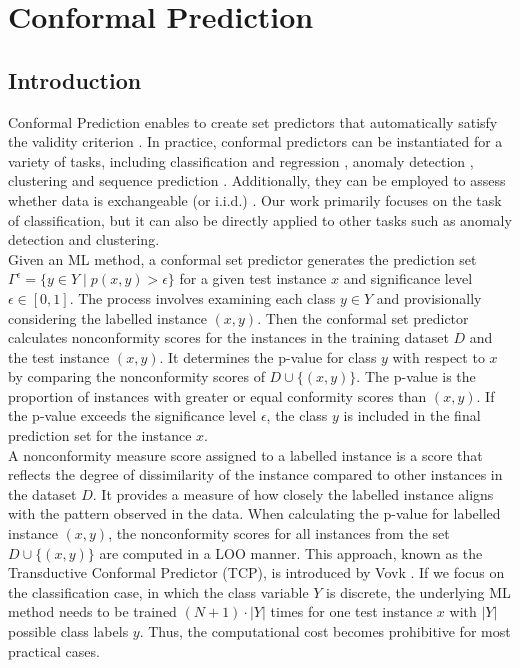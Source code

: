 \documentclass[10pt]{reportMaster}
\begin{document}
\section{Conformal Prediction}

\subsection{Introduction}

Conformal Prediction enables to create set predictors that automatically satisfy the validity criterion \cite{vovk2005algorithmic}. In practice, conformal predictors can be instantiated for a variety of tasks, including classification and regression \cite{vovk2005algorithmic, papadopoulos2002inductive, nouretdinov2001ridge}, anomaly detection \cite{laxhammar2010conformal}, clustering \cite{cherubin2015conformal, jung2021clustering} and sequence prediction \cite{cherubin2016hidden}. Additionally, they can be employed to assess whether data is exchangeable (or i.i.d.) \cite{vovk2003testing}. Our work primarily focuses on the task of classification, but it can also be directly applied to other tasks such as anomaly detection and clustering.\\

\noindent  Given an ML method, a conformal set predictor generates the prediction set $\Gamma^{\epsilon} = \{y \in Y \;|\; p(x,y)>\epsilon\}$ for a given test instance $x$ and significance level $\epsilon \in [0, 1]$. The process involves examining each class $y \in Y$ and provisionally considering the labelled instance $(x, y)$. Then the conformal set predictor calculates nonconformity scores for the instances in the training dataset $D$ and the test instance $(x, y)$. It determines the p-value for class $y$ with respect to $x$ by comparing the nonconformity scores of $D \cup \{(x, y)\}$. The p-value is the proportion of instances with greater or equal conformity scores than $(x, y)$. If the p-value exceeds the significance level $\epsilon$, the class $y$ is included in the final prediction set for the instance $x$.\\

\noindent A nonconformity measure score assigned to a labelled instance is a score that reflects the degree of dissimilarity of the instance compared to other instances in the dataset $D$. It provides a measure of how closely the labelled instance aligns with the pattern observed in the data. When calculating the p-value for labelled instance $(x, y)$, the nonconformity scores for all instances from the set $D \cup \{(x, y)\}$ are computed in a LOO manner. This approach, known as the Transductive Conformal Predictor (TCP), is introduced by Vovk \cite{vovk2005algorithmic}. If we focus on the classification case, in which the class variable $Y$ is discrete, the underlying ML method needs to be trained $(N+1)\cdot|Y|$ times for one test instance $x$ with $|Y|$ possible class labels $y$. Thus, the computational cost becomes prohibitive for most practical cases.
\end{document}
